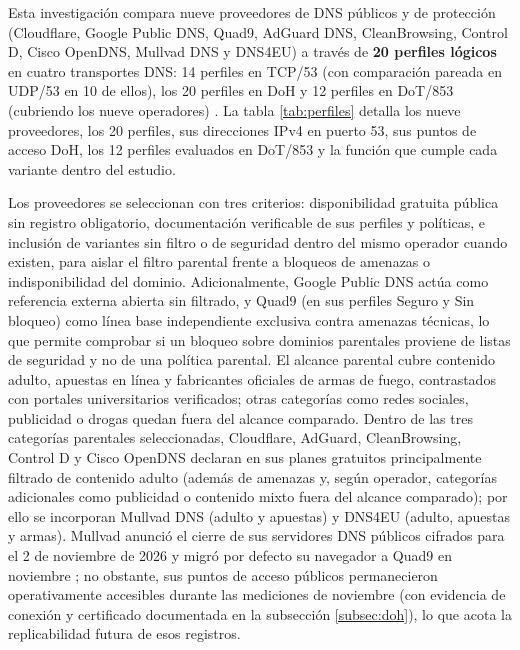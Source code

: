 \documentclass[10pt,a4paper]{article}
\begin{document}
Esta investigación compara nueve proveedores de DNS públicos y de protección (Cloudflare, Google Public DNS, Quad9, AdGuard DNS, CleanBrowsing, Control D, Cisco OpenDNS, Mullvad DNS y DNS4EU) a través de \textbf{20 perfiles lógicos} en cuatro transportes DNS: 14 perfiles en TCP/53 (con comparación pareada en UDP/53 en 10 de ellos), los 20 perfiles en DoH y 12 perfiles en DoT/853 (cubriendo los nueve operadores) \cite{cloudflare,google,quad9,adguardpublic,cleanbrowsingfree,controldfree,opendnssetup,mullvaddns,dns4euperfiles}. La tabla \ref{tab:perfiles} detalla los nueve proveedores, los 20 perfiles, sus direcciones IPv4 en puerto 53, sus puntos de acceso DoH, los 12 perfiles evaluados en DoT/853 y la función que cumple cada variante dentro del estudio.

Los proveedores se seleccionan con tres criterios: disponibilidad gratuita pública sin registro obligatorio, documentación verificable de sus perfiles y políticas, e inclusión de variantes sin filtro o de seguridad dentro del mismo operador cuando existen, para aislar el filtro parental frente a bloqueos de amenazas o indisponibilidad del dominio. Adicionalmente, Google Public DNS actúa como referencia externa abierta sin filtrado, y Quad9 (en sus perfiles Seguro y Sin bloqueo) como línea base independiente exclusiva contra amenazas técnicas, lo que permite comprobar si un bloqueo sobre dominios parentales proviene de listas de seguridad y no de una política parental. El alcance parental cubre contenido adulto, apuestas en línea y fabricantes oficiales de armas de fuego, contrastados con portales universitarios verificados; otras categorías como redes sociales, publicidad o drogas quedan fuera del alcance comparado. Dentro de las tres categorías parentales seleccionadas, Cloudflare, AdGuard, CleanBrowsing, Control D y Cisco OpenDNS declaran en sus planes gratuitos principalmente filtrado de contenido adulto (además de amenazas y, según operador, categorías adicionales como publicidad o contenido mixto fuera del alcance comparado); por ello se incorporan Mullvad DNS (adulto y apuestas) y DNS4EU (adulto, apuestas y armas). Mullvad anunció el cierre de sus servidores DNS públicos cifrados para el 2 de noviembre de 2026 y migró por defecto su navegador a Quad9 en noviembre \cite{mullvadretiro}; no obstante, sus puntos de acceso públicos permanecieron operativamente accesibles durante las mediciones de noviembre (con evidencia de conexión y certificado documentada en la subsección \ref{subsec:doh}), lo que acota la replicabilidad futura de esos registros.
\end{document}

